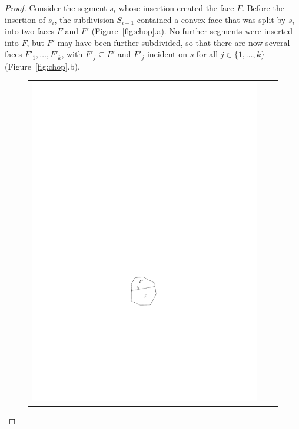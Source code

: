\documentclass{article}
\begin{document}
\begin{proof}
Consider the segment $s_i$ whose insertion created the face $F$.
Before the insertion of $s_i$, the subdivision $S_{i-1}$ contained
a convex face that was split by $s_i$ into two faces $F$ and $F'$
(Figure~\ref{fig:chop}.a).  No further segments were inserted into
$F$, but $F'$ may have been further subdivided, so that there are now
several faces $F'_1,\ldots,F'_k$, with $F'_j\subseteq F'$ and $F'_j$ incident on $s$ for all $j\in\{1,\ldots,k\}$
(Figure~\ref{fig:chop}.b).

\begin{figure}
  \begin{center}
    \begin{tabular}{ccc}
      \includegraphics{chop-a} &   

\end{tabular}
\end{center}
\end{figure}
\end{proof}
\end{document}
